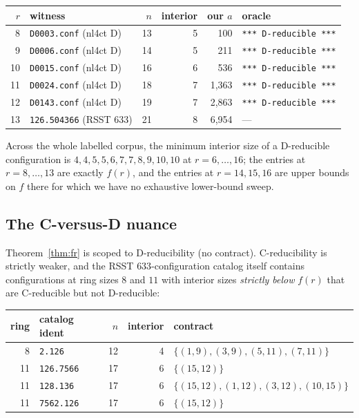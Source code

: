 \documentclass[11pt]{article}
\theoremstyle{definition}
\begin{document}
\begin{center}\small
\begin{tabular}{rlrrrl}
\toprule
$r$ & witness & $n$ & interior & our $a$ & oracle \\
\midrule
8  & \texttt{D0003.conf} (nl4ct D) & 13 & 5 & 100   & \texttt{*** D-reducible ***} \\
9  & \texttt{D0006.conf} (nl4ct D) & 14 & 5 & 211   & \texttt{*** D-reducible ***} \\
10 & \texttt{D0015.conf} (nl4ct D) & 16 & 6 & 536   & \texttt{*** D-reducible ***} \\
11 & \texttt{D0024.conf} (nl4ct D) & 18 & 7 & 1{,}363 & \texttt{*** D-reducible ***} \\
12 & \texttt{D0143.conf} (nl4ct D) & 19 & 7 & 2{,}863 & \texttt{*** D-reducible ***} \\
13 & \texttt{126.504366} (RSST 633) & 21 & 8 & 6{,}954 & --- \\
\bottomrule
\end{tabular}
\end{center}

Across the whole labelled corpus, the minimum interior size of a D-reducible
configuration is $4,4,5,5,6,7,7,8,9,10,10$ at $r=6,\dots,16$; the entries at
$r=8,\dots,13$ are exactly $f(r)$, and the entries at $r=14,15,16$ are upper bounds
on $f$ there for which we have no exhaustive lower-bound sweep.

\subsection{The C-versus-D nuance}
\label{sec:cvsd}

Theorem~\ref{thm:fr} is scoped to D-reducibility (no contract). C-reducibility is
strictly weaker, and the RSST $633$-configuration catalog itself contains
configurations at ring sizes $8$ and $11$ with interior sizes \emph{strictly below}
$f(r)$ that are C-reducible but not D-reducible:

\begin{center}\small
\begin{tabular}{rlrrl}
\toprule
ring & catalog ident & $n$ & interior & contract \\
\midrule
8  & \texttt{2.126}    & 12 & 4 & $\{(1,9),(3,9),(5,11),(7,11)\}$ \\
11 & \texttt{126.7566} & 17 & 6 & $\{(15,12)\}$ \\
11 & \texttt{128.136}  & 17 & 6 & $\{(15,12),(1,12),(3,12),(10,15)\}$ \\
11 & \texttt{7562.126} & 17 & 6 & $\{(15,12)\}$ \\
\bottomrule
\end{tabular}
\end{center}
\end{document}
